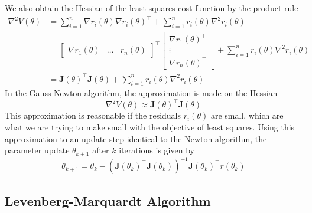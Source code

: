 \documentclass[11pt]{report} %
\begin{document}
We also obtain the Hessian of the least squares cost function by the product rule
\begin{align}
\nabla^{2}V\left(\theta\right) &= \sum_{i = 1}^{n}\nabla r_{i}\left(\theta\right)\nabla r_{i}\left(\theta\right)^{\top} + \sum_{i = 1}^{n}r_{i}\left(\theta\right)\nabla^{2}r_{i}\left(\theta\right) \\
&= \begin{bmatrix} \nabla r_{1}\left(\theta\right) & \dots & r_{n}\left(\theta\right)\end{bmatrix}^{\top} \begin{bmatrix} \nabla r_{1}\left(\theta\right)^{\top} \\ \vdots \\ \nabla r_{n}\left(\theta\right)^{\top} \end{bmatrix} + \sum_{i = 1}^{n}r_{i}\left(\theta\right)\nabla^{2}r_{i}\left(\theta\right) \\
&= \mathbf{J}\left(\theta\right)^{\top}\mathbf{J}\left(\theta\right) + \sum_{i = 1}^{n}r_{i}\left(\theta\right)\nabla^{2}r_{i}\left(\theta\right)
\end{align}
In the Gauss-Newton algorithm, the approximation is made on the Hessian
\begin{equation}
\nabla^{2}V\left(\theta\right) \approx \mathbf{J}\left(\theta\right)^{\top}\mathbf{J}\left(\theta\right)
\end{equation}
This approximation is reasonable if the residuals $r_{i}\left(\theta\right)$ are small, which are what we are trying to make small with the objective of least squares. Using this approximation to an update step identical to the Newton algorithm, the parameter update $\theta_{k + 1}$ after $k$ iterations is given by
\begin{equation}
\theta_{k + 1} = \theta_{k} - \left(\mathbf{J}\left(\theta_{k}\right)^{\top}\mathbf{J}\left(\theta_{k}\right)\right)^{-1}\mathbf{J}\left(\theta_{k}\right)^{\top}r\left(\theta_{k}\right)
\end{equation}

\subsection{Levenberg-Marquardt Algorithm}
\end{document}
